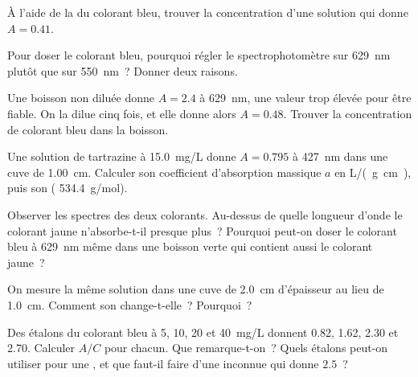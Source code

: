 \begin{exercise}[$\star\star$]\label{exo:g11:absorbance:6}
À l'aide de la  du colorant bleu, trouver la
concentration d'une solution qui donne $A = 0.41$.
\end{exercise}

\begin{exercise}[$\star\star$]\label{exo:g11:absorbance:7}
Pour doser le colorant bleu, pourquoi régler le spectrophotomètre sur
\qty{629}{nm} plutôt que sur \qty{550}{nm}~? Donner deux raisons.
\end{exercise}

\begin{exercise}[$\star\star$]\label{exo:g11:absorbance:8}
Une boisson non diluée donne $A = 2.4$ à \qty{629}{nm}, une valeur trop
élevée pour être fiable. On la dilue cinq fois, et elle donne alors
$A = 0.48$. Trouver la concentration de colorant bleu dans la boisson.
\end{exercise}

\begin{exercise}[$\star\star$]\label{exo:g11:absorbance:9}
Une solution de tartrazine à \qty{15.0}{mg/L} donne $A = 0.795$ à
\qty{427}{nm} dans une cuve de \qty{1.00}{cm}. Calculer son coefficient
d'absorption massique $a$ en \si{L/(g.cm)}, puis son  ( \qty{534.4}{g/mol}).
\end{exercise}

\begin{exercise}[$\star\star$]\label{exo:g11:absorbance:10}
Observer les spectres des deux colorants. Au-dessus de quelle longueur
d'onde le colorant jaune n'absorbe-t-il presque plus~? Pourquoi
peut-on doser le colorant bleu à \qty{629}{nm} même dans une boisson
verte qui contient aussi le colorant jaune~?
\end{exercise}

\begin{exercise}[$\star\star$]\label{exo:g11:absorbance:11}
On mesure la même solution dans une cuve de \qty{2.0}{cm} d'épaisseur au
lieu de \qty{1.0}{cm}. Comment son  change-t-elle~? Pourquoi~?
\end{exercise}

\begin{exercise}[$\star\star\star$]\label{exo:g11:absorbance:12}
Des étalons du colorant bleu à 5, 10, 20 et \qty{40}{mg/L} donnent 0.82,
1.62, 2.30 et 2.70. Calculer $A / C$ pour chacun. Que remarque-t-on~?
Quels étalons peut-on utiliser pour une , et que
faut-il faire d'une inconnue qui donne $2.5$~?
\end{exercise}

